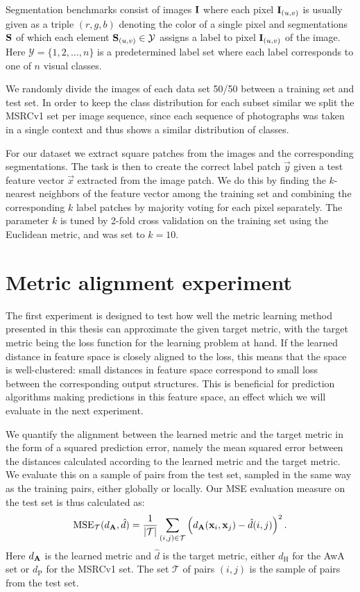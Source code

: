 Segmentation benchmarks consist of images $\mathbf{I}$ where each pixel $\mathbf{I}_{(u,v)}$ is usually given as a triple $(r,g,b)$ denoting the color of a single pixel and segmentations $\mathbf{S}$ of which each element  $\mathbf{S}_{(u,v)} \in \mathcal{Y}$ assigns a label to pixel $\mathbf{I}_{(u,v)}$ of the image. Here $\mathcal{Y} = \{1, 2, \ldots, n\}$ is a predetermined label set  where each label corresponds to one of $n$ visual classes. 

We randomly divide the images of each data set 50/50 between a training set and test set. In order to keep the class distribution for each subset similar we split the \ac{MSRCv1} set per image sequence, since each sequence of photographs was taken in a single context and thus shows a similar distribution of classes.

For our dataset we extract square patches from the images and the corresponding segmentations. The task is then to create the correct label patch $\vec{y}$ given a test feature vector $\vec{x}$ extracted from the image patch. We do this by finding the $k$-nearest neighbors of the feature vector among the training set and combining the corresponding $k$ label patches by majority voting for each pixel separately. The parameter $k$ is tuned by 2-fold cross validation on the training set using the Euclidean metric, and was set to $k = 10$.



\section{Metric alignment experiment}

The first experiment is designed to test how well the metric learning method presented in this thesis can approximate the given target metric, with the target metric being the loss function for the learning problem at hand. If the learned distance in feature space is closely aligned to the loss, this means that the space is well-clustered: small distances in feature space correspond to small loss between the corresponding output structures. This is beneficial for prediction algorithms making predictions in this feature space, an effect which we will evaluate in the next experiment. 

We quantify the alignment between the learned metric and the target metric in the form of a squared prediction error, namely the mean squared error between the distances calculated according to the learned metric and the target metric.  We evaluate this on a sample of pairs from the test set, sampled in the same way as the training pairs, either globally or locally. Our \ac{MSE} evaluation measure on the test set is thus calculated as:
\begin{equation}
\text{MSE}_{\mathcal{T}}(d_{\mathbf{A}}, \hat{d}) = 
\frac{1}{|\mathcal{T}|}\sum_{(i,j) \in \mathcal{T}} \left(d_{\mathbf{A}}(\mathbf{x}_i, \mathbf{x}_j) - \hat{d}(i, j)\right)^2.
\end{equation} 
Here $d_{\mathbf{A}}$ is the learned metric and $\hat{d}$ is the target metric, either $d_{\text{H}}$ for the \ac{AwA} set or $d_{\text{P}}$ for the \ac{MSRCv1} set. The set $\mathcal{T}$ of pairs $(i,j)$ is the sample of pairs from the test set.

